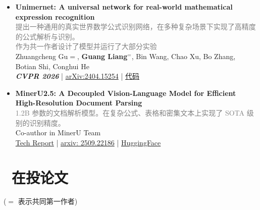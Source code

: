 \documentclass[10pt]{resume}
\begin{document}
\begin{itemize}[leftmargin=*, parsep=0.5ex]
    \item \textbf{Unimernet: A universal network for real-world mathematical expression recognition} \\
    [0.2em]
        \textcolor{gray}{\small{提出一种通用的真实世界数学公式识别网络，在多种复杂场景下实现了高精度的公式解析与识别。    \\作为共一作者设计了模型并运行了大部分实验}} \\
          \small{
          Zhuangcheng Gu$=$, \textbf{Guang Liang}$^{=}$, Bin Wang, Chao Xu, Bo Zhang, Botian Shi, Conghui He \\
          \textbf{\textit{CVPR 2026}} |
          \href{https://arxiv.org/abs/2404.15254}{arXiv:2404.15254} | \href{https://github.com/opendatalab/UniMERNet}{代码}
          }
          \\
    \item \textbf{MinerU2.5: A Decoupled Vision-Language Model for Efficient High-Resolution Document Parsing} \\
    [0.2em]
    \textcolor{gray}{\small{1.2B 参数的文档解析模型。在复杂公式、表格和密集文本上实现了 SOTA 级别的识别精度。}} \\
        Co-author in MinerU Team \\
        \small{
        \href{https://arxiv.org/abs/2509.22186}{Tech Report} | 
        \href{https://arxiv.org/abs/2509.22186}{arxiv: 2509.22186} | 
        \href{https://huggingface.co/opendatalab/MinerU2.5-2509-1.2B}{HuggingFace}
        }
\end{itemize}

\section{\faFileTextO\ 在投论文}
($=$ 表示共同第一作者)
\end{document}
